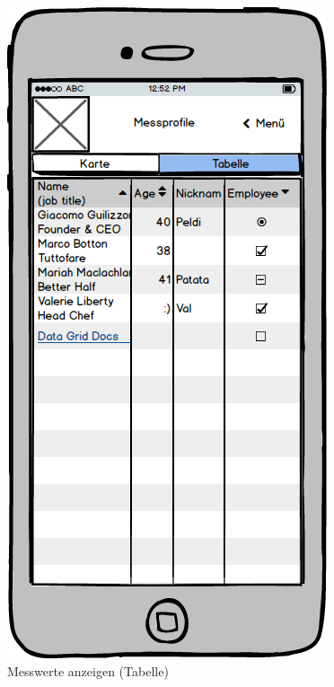\begin{figure}
	\centering
	\includegraphics[scale=0.8]{images/MesswerteAnzeigenTabelle}
	\caption{Messwerte anzeigen (Tabelle)}
\end{figure}
\newpage